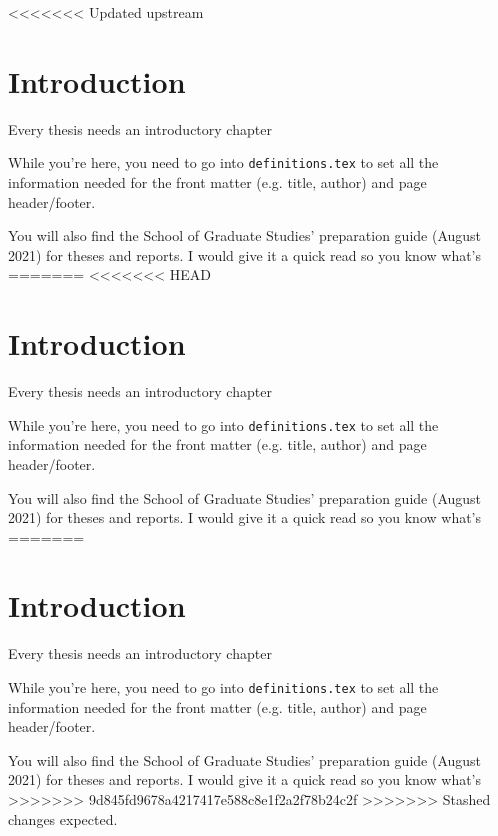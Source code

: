 <<<<<<< Updated upstream
\chapter{Introduction}

Every thesis needs an introductory chapter

While you're here, you need to go into \texttt{definitions.tex} to set all the 
information needed for the front matter (e.g. title, author) and page 
header/footer.

You will also find the School of Graduate Studies' preparation guide (August 
2021) for theses and reports. I would give it a quick read so you know what's 
=======
<<<<<<< HEAD
\chapter{Introduction}

Every thesis needs an introductory chapter

While you're here, you need to go into \texttt{definitions.tex} to set all the 
information needed for the front matter (e.g. title, author) and page 
header/footer.

You will also find the School of Graduate Studies' preparation guide (August 
2021) for theses and reports. I would give it a quick read so you know what's 
=======
\chapter{Introduction}

Every thesis needs an introductory chapter

While you're here, you need to go into \texttt{definitions.tex} to set all the 
information needed for the front matter (e.g. title, author) and page 
header/footer.

You will also find the School of Graduate Studies' preparation guide (August 
2021) for theses and reports. I would give it a quick read so you know what's 
>>>>>>> 9d845fd9678a4217417e588c8e1f2a2f78b24c2f
>>>>>>> Stashed changes
expected.